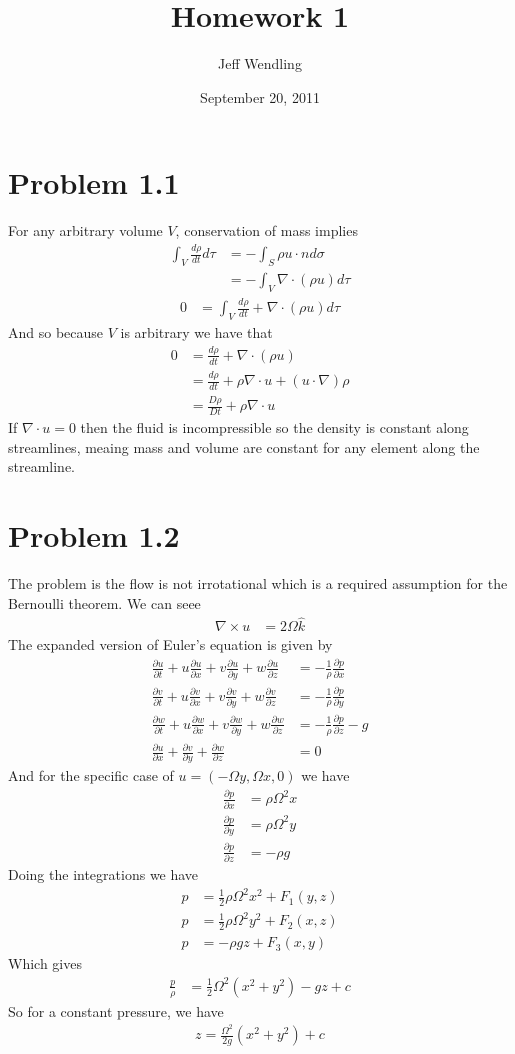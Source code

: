 \documentclass[12pt]{article}
\title{Homework 1}
\author{Jeff Wendling}
\date{September 20, 2011}
\newcommand{\eq}[1]{\begin{align*}#1\end{align*}}
\newcommand{\p}[2]{\frac{\partial#1}{\partial#2}}
\begin{document}
\maketitle
\section*{Problem 1.1}
For any arbitrary volume $V$, conservation of mass implies
\eq{
	\int_V \frac{d\rho}{dt} d\tau &= -\int_S \rho u \cdot n d\sigma\\
	&= -\int_V \nabla\cdot(\rho u)d\tau
}
\eq{
	0 &= \int_V \frac{d\rho}{dt} + \nabla\cdot(\rho u) d\tau
}
And so because $V$ is arbitrary we have that
\eq{
	0 &= \frac{d\rho}{dt} + \nabla\cdot(\rho u)\\
	&= \frac{d\rho}{dt} + \rho\nabla\cdot u + (u\cdot\nabla)\rho\\
	&= \frac{D\rho}{Dt} + \rho\nabla\cdot u
}
If $\nabla\cdot u = 0$ then the fluid is incompressible so the density is constant along streamlines, meaing mass and volume are constant for any element along the streamline.
\section*{Problem 1.2} The problem is the flow is not irrotational which is a required assumption for the Bernoulli theorem. We can seee
\eq{
	\nabla \times u &= 2\Omega\hat{k}
}
The expanded version of Euler's equation is given by
\eq{
	\p{u}{t} + u\p{u}{x} + v\p{u}{y} + w\p{u}{z} &= -\frac{1}{\rho}\p{p}{x}\\
	\p{v}{t} + u\p{v}{x} + v\p{v}{y} + w\p{v}{z} &= -\frac{1}{\rho}\p{p}{y}\\
	\p{w}{t} + u\p{w}{x} + v\p{w}{y} + w\p{w}{z} &= -\frac{1}{\rho}\p{p}{z} - g\\
	\p{u}{x} + \p{v}{y} + \p{w}{z} &= 0
}
And for the specific case of $u = (-\Omega y, \Omega x, 0)$ we have
\eq{
	\p{p}{x} &= \rho\Omega^2 x\\
	\p{p}{y} &= \rho\Omega^2 y\\
	\p{p}{z} &= -\rho g
}
Doing the integrations we have
\eq{
	p &= \frac{1}{2}\rho\Omega^2 x^2 + F_1(y,z)\\
	p &= \frac{1}{2}\rho\Omega^2 y^2 + F_2(x,z)\\
	p &= -\rho gz + F_3(x,y)
}
Which gives
\eq{
	\frac{p}{\rho} &= \frac{1}{2}\Omega^2(x^2 + y^2) - gz + c
}
So for a constant pressure, we have
\eq{
	z = \frac{\Omega^2}{2g}(x^2 + y^2) + c
}
\end{document}
